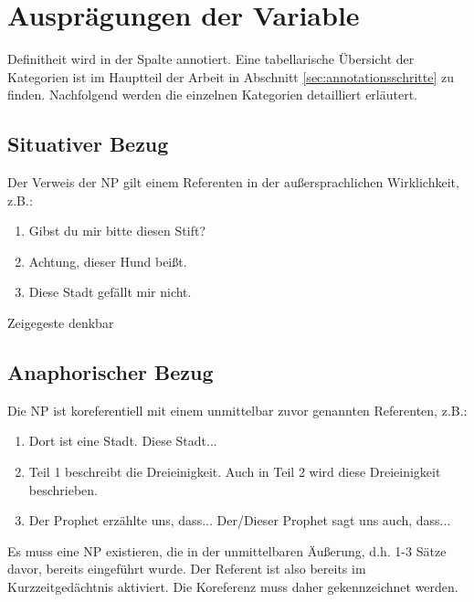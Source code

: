 {\section{Ausprägungen der Variable } \label{sec:richtlinien-definitheit}
 
Definitheit wird in der Spalte  annotiert. Eine tabellarische Übersicht der Kategorien ist im Hauptteil der Arbeit in Abschnitt \ref{sec:annotationsschritte} zu finden. Nachfolgend werden die einzelnen Kategorien detailliert erläutert. 
 

\subsection{Situativer Bezug}

Der Verweis der NP gilt einem Referenten in der außersprachlichen Wirklichkeit, z.B.: 

\begin{enumerate}
\item Gibst du mir bitte diesen Stift? 
\item Achtung, dieser Hund beißt. 
\item Diese Stadt gefällt mir nicht.  
\end{enumerate}

\noindent 
{} Zeigegeste denkbar 

\subsection{Anaphorischer Bezug}

Die NP ist koreferentiell mit einem unmittelbar zuvor genannten Referenten, z.B.: 

\begin{enumerate}
\item Dort ist eine Stadt. Diese Stadt...
\item Teil 1 beschreibt die Dreieinigkeit. Auch in Teil 2 wird diese Dreieinigkeit beschrieben.
\item Der Prophet erzählte uns, dass... Der/Dieser Prophet sagt uns auch, dass...
\end{enumerate}

\noindent 
{} Es muss eine NP existieren, die in der unmittelbaren Äußerung, d.h. 1-3 Sätze davor, bereits eingeführt wurde. Der Referent ist also bereits im Kurzzeitgedächtnis aktiviert. Die Koreferenz muss daher gekennzeichnet werden. 

}
